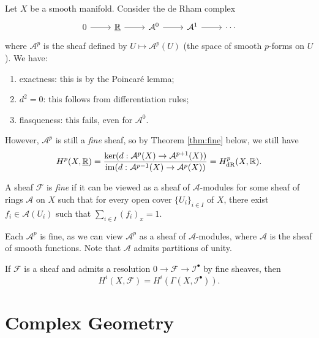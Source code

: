\begin{example}
  Let $X$ be a smooth manifold. Consider
  the de Rham complex
  \[
    \begin{tikzcd}
      0 \ar[r] & \underline{\R}
      \ar[r] & \mathcal{A}^0
      \ar[r] & \mathcal{A}^1
      \ar[r] & \cdots
    \end{tikzcd}
  \]
  where $\mathcal{A}^p$ is the sheaf
  defined by
  $U \mapsto \mathcal{A}^p(U)$ (the space of
  smooth $p$-forms on $U$). We have:
  \begin{enumerate}
    \item exactness: this is by the Poincar\'e lemma;
    \item $d^2 = 0$: this follows from differentiation rules;
    \item flasqueness: this fails, even
      for $\mathcal{A}^0$.
  \end{enumerate}
  However, $\mathcal{A}^p$ is still
  a \emph{fine} sheaf, so by Theorem
  \ref{thm:fine} below, we still have
  \[
    H^p(X, \underline{\mathbb{R}})
    = \frac{\ker(d : \mathcal{A}^p(X) \to \mathcal{A}^{p + 1}(X))}{\operatorname{im}(d : \mathcal{A}^{p - 1}(X) \to \mathcal{A}^p(X))}
    = H^p_{\mathrm{dR}}(X, \mathbb{R}).
  \]
\end{example}

\begin{definition}
  A sheaf $\mathcal{F}$ is \emph{fine} if
  it can be viewed as a sheaf of
  $\mathcal{A}$-modules for some sheaf of
  rings $\mathcal{A}$ on $X$ such that
  for every open cover $\{U_i\}_{i \in I}$
  of $X$, there exist $f_i \in \mathcal{A}(U_i)$
  such that
  $\sum_{i \in I} (f_i)_x = 1$.
\end{definition}

\begin{example}
  Each $\mathcal{A}^p$ is fine, as we can
  view $\mathcal{A}^p$
  as a sheaf of $\mathcal{A}$-modules,
  where $\mathcal{A}$ is the sheaf of
  smooth functions. Note that
  $\mathcal{A}$ admits partitions of unity.
\end{example}

\begin{theorem}\label{thm:fine}
  If $\mathcal{F}$ is a sheaf and admits a
  resolution
  $0 \to \mathcal{F} \to \mathcal{I}^\bullet$
  by fine sheaves, then
  \[
    H^i(X, \mathcal{F})
    = H^i(\Gamma(X, \mathcal{I}^\bullet)).
  \]
\end{theorem}

\section{Complex Geometry}

